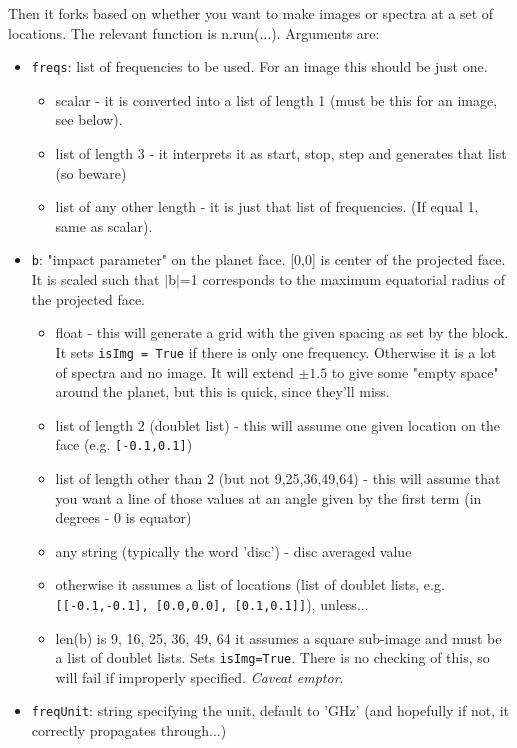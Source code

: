 \documentclass[11pt]{article}
\begin{document}
Then it forks based on whether you want to make images or spectra at a set of locations.  The relevant function is n.run(...).  Arguments are:
\begin{itemize}
\item \texttt{freqs}:   list of frequencies to be used. For an image this should be just one.
	\begin{itemize}
	\item scalar - it is converted into a list of length 1 (must be this for an image, see below).
	\item list of length 3 - it interprets it as start, stop, step and generates that list (so beware)
        \item list of any other length - it is just that list of frequencies.  (If equal 1, same as scalar).
	\end{itemize}
\item \texttt{b}:  "impact parameter" on the planet face.  [0,0] is center of the projected face.  It is scaled such that $|$b$|$=1 corresponds to the maximum equatorial radius of the projected face.
	\begin{itemize}
	\item float - this will generate a grid with the given spacing as set by the block.  It sets \texttt{isImg = True} if there is only one frequency.  Otherwise it is a lot of spectra and no image.  It will extend $\pm 1.5$ to give some "empty space" around the planet, but this is quick, since they'll miss.
	\item list of length 2 (doublet list) - this will assume one given location on the face (e.g. \texttt{[-0.1,0.1]})
	\item list of length other than 2 (but not 9,25,36,49,64) - this will assume that you want a line of those values at an angle given by the first term (in degrees - 0 is equator)
	\item any string (typically the word 'disc') - disc averaged value
	\item otherwise it assumes a list of locations (list of doublet lists, e.g. \texttt{[[-0.1,-0.1], }\texttt{[0.0,0.0], }\texttt{[0.1,0.1]]}), unless...
	\item len(b) is 9, 16, 25, 36, 49, 64 it assumes a square sub-image and must be a list of doublet lists.  Sets \texttt{isImg=True}.  There is no checking of this, so will fail if improperly specified.  {\em Caveat emptor}.
	\end{itemize}
\item \texttt{freqUnit}:  string specifying the unit, default to 'GHz' (and hopefully if not, it correctly propagates through...)

\end{itemize}
\end{document}
